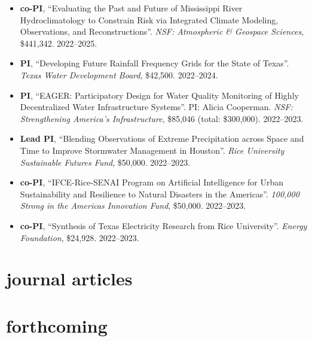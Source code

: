 \documentclass[10pt,oneside]{article}
\begin{document}
\begin{itemize}[label={}]
  
  \item \textbf{co-PI}, \enquote{Evaluating the Past and Future of Mississippi River Hydroclimatology to Constrain Risk via Integrated Climate Modeling, Observations, and Reconstructions}.  \textit{NSF: Atmospheric \& Geospace Sciences}, \$441,342. 2022--2025.
        
  \item \textbf{PI}, \enquote{Developing Future Rainfall Frequency Grids for the State of Texas}.  \textit{Texas Water Development Board}, \$42,500. 2022--2024.
        
  \item \textbf{PI}, \enquote{EAGER: Participatory Design for Water Quality Monitoring of Highly Decentralized Water Infrastructure Systems}.  PI: Alicia Cooperman. \textit{NSF: Strengthening America's Infrastructure}, \$85,046 (total: \$300,000). 2022--2023.
        
  \item \textbf{Lead PI}, \enquote{Blending Observations of Extreme Precipitation across Space and Time to Improve Stormwater Management in Houston}.  \textit{Rice University Sustainable Futures Fund}, \$50,000. 2022--2023.
        
  \item \textbf{co-PI}, \enquote{IFCE-Rice-SENAI Program on Artificial Intelligence for Urban Sustainability and Resilience to Natural Disasters in the Americas}.  \textit{100,000 Strong in the Americas Innovation Fund}, \$50,000. 2022--2023.
        
  \item \textbf{co-PI}, \enquote{Synthesis of Texas Electricity Research from Rice University}.  \textit{Energy Foundation}, \$24,928. 2022--2023.
        
\end{itemize}


\section{journal articles}

\mbox{}\vspace{-\dimexpr\baselineskip\relax}
\vspace*{-1em}

\printbibliography[type=article, heading=none]

\section{forthcoming}
\end{document}
